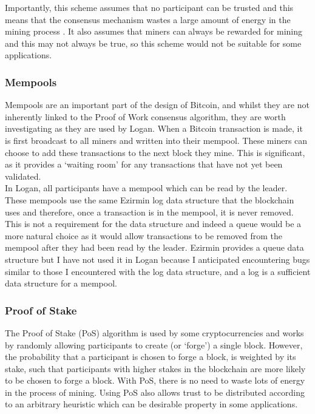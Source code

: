 \documentclass[12pt,a4paper,twoside,openright]{report}
\begin{document}
	Importantly, this scheme assumes that no participant can be trusted 
	and this means that the consensus mechanism wastes a large amount of energy in the mining process \parencite{BitcoinEnergy}.
	It also assumes that miners can always be rewarded for mining and this may not always be true, so this scheme would not be suitable for some applications.
	
	\subsubsection*{Mempools}
	Mempools are an important part of the design of Bitcoin, and whilst they are not inherently linked to the Proof of Work consensus algorithm, they are worth investigating as they are used by Logan.
	When a Bitcoin transaction is made, it is first broadcast to all miners and written into their mempool. 
	These miners can choose to add these transactions to the next block they mine.
	This is significant, as it provides a `waiting room' for any transactions that have not yet been validated.\\

	In Logan, all participants have a mempool which can be read by the leader. 
	These mempools use the same Ezirmin log data structure that the blockchain uses and therefore, once a transaction is in the mempool, it is never removed. 
	This is not a requirement for the data structure and indeed a queue would be a more natural choice as it would allow transactions to be removed from the mempool after they had been read by the leader.
	Ezirmin provides a queue data structure but I have not used it in Logan because I anticipated encountering bugs similar to those I encountered with the log data structure, and a log is a sufficient data structure for a mempool.

	\subsubsection*{Proof of Stake}
	The Proof of Stake (PoS) algorithm \parencite{ProofofStake} is used by some cryptocurrencies and works by randomly allowing participants to create (or `forge') a single block.
	However, the probability that a participant is chosen to forge a block, is weighted by its stake, such that participants with higher stakes in the blockchain are more likely to be chosen to forge a block.
	With PoS, there is no need to waste lots of energy in the process of mining. 
	Using PoS also allows trust to be distributed according to an arbitrary heuristic which can be desirable property in some applications.\\
\end{document}
